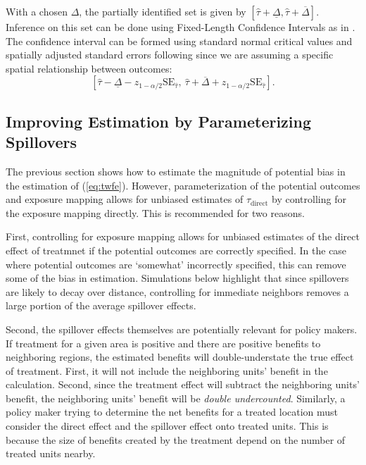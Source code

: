 \documentclass[11pt]{article}
\begin{document}
With a chosen $\Delta$, the partially identified set is given by $[\hat{\tau} + \underline{\Delta}, \hat{\tau} + \overline{\Delta}]$. Inference on this set can be done using Fixed-Length Confidence Intervals as in \citet{Rambachan_Roth_2020}. The confidence interval can be formed using standard normal critical values and spatially adjusted standard errors following \citet{Conley_1999} since we are assuming a specific spatial relationship between outcomes: \[ 
    \left[ \hat{\tau} - \underline{\Delta} - z_{1 - \alpha/2} \text{SE}_{\hat{\tau}}, \ \hat{\tau} + \overline{\Delta} + z_{1 - \alpha/2} \text{SE}_{\hat{\tau}}\right].  
\]


\subsection{Improving Estimation by Parameterizing Spillovers}

The previous section shows how to estimate the magnitude of potential bias in the estimation of (\ref{eq:twfe}). However, parameterization of the potential outcomes and exposure mapping allows for unbiased estimates of $\tau_{\text{direct}}$ by controlling for the exposure mapping directly. This is recommended for two reasons. 

First, controlling for exposure mapping allows for unbiased estimates of the direct effect of treatmnet if the potential outcomes are correctly specified. In the case where potential outcomes are `somewhat' incorrectly specified, this can remove some of the bias in estimation. Simulations below highlight that since spillovers are likely to decay over distance, controlling for immediate neighbors removes a large portion of the average spillover effects.

Second, the spillover effects themselves are potentially relevant for policy makers. If treatment for a given area is positive and there are positive benefits to neighboring regions, the estimated benefits will double-understate the true effect of treatment. First, it will not include the neighboring units' benefit in the calculation. Second, since the treatment effect will subtract the neighboring units' benefit, the neighboring units' benefit will be \emph{double undercounted}. Similarly, a policy maker trying to determine the net benefits for a treated location must consider the direct effect and the spillover effect onto treated units. This is because the size of benefits created by the treatment depend on the number of treated units nearby.
\end{document}
